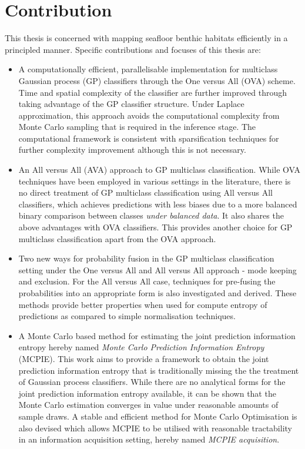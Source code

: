 	\section{Contribution}
	\label{Introduction:Contribution}
	
		This thesis is concerned with mapping seafloor benthic habitats efficiently in a principled manner. Specific contributions and focuses of this thesis are:
		
		\begin{itemize}
		
			\item A computationally efficient, parallelisable implementation for multiclass Gaussian process (GP) classifiers through the One versus All (OVA) scheme. Time and spatial complexity of the classifier are further improved through taking advantage of the GP classifier structure. Under Laplace approximation, this approach avoids the computational complexity from Monte Carlo sampling that is required in the inference stage. The computational framework is consistent with sparsification techniques for further complexity improvement although this is not necessary.
			
			\item An All versus All (AVA) approach to GP multiclass classification. While OVA techniques have been employed in various settings in the literature, there is no direct treatment of GP multiclass classification using All versus All classifiers, which achieves predictions with less biases due to a more balanced binary comparison between classes \textit{under balanced data}. It also shares the above advantages with OVA classifiers. This provides another choice for GP multiclass classification apart from the OVA approach.

			\item Two new ways for probability fusion in the GP multiclass classification setting under the One versus All and All versus All approach - mode keeping and exclusion. For the All versus All case, techniques for pre-fusing the probabilities into an appropriate form is also investigated and derived. These methods provide better properties when used for compute entropy of predictions as compared to simple normalisation techniques.
			
			\item A Monte Carlo based method for estimating the joint prediction information entropy hereby named \textit{Monte Carlo Prediction Information Entropy} (MCPIE). This work aims to provide a framework to obtain the joint prediction information entropy that is traditionally missing the the treatment of Gaussian process classifiers. While there are no analytical forms for the joint prediction information entropy available, it can be shown that the Monte Carlo estimation converges in value under reasonable amounts of sample draws. A stable and efficient method for Monte Carlo Optimisation is also devised which allows MCPIE to be utilised with reasonable tractability in an information acquisition setting, hereby named \textit{MCPIE acquisition}.
			

\end{itemize}
